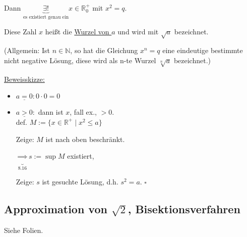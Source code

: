 \documentclass[a4paper, 12pt, twoside] {article}
\begin{document}
Dann $\underbrace{\exists ! }_{\text{es existiert genau ein}} x \in \mathbb{R}_{0}^{+}$ mit $x^2 = q$.

Diese Zahl $x$ heißt die \underline{Wurzel von $a$} und wird mit $\sqrt{a}$ bezeichnet.

(Allgemein: Ist $n \in \mathbb{N}$, so hat die Gleichung $x^n = q$ eine eindeutige bestimmte nicht negative Lösung, diese wird als n-te Wurzel $\sqrt[n]{a}$ bezeichnet.)

\underline{Beweisskizze:}

\begin{itemize}

\item $\underline{a = 0}: 0 \cdot 0 = 0$ \checkmark

\item $\underline{a > 0}:$ dann ist $x$, fall ex., $> 0$. \\
def. $M := \{ x \in \mathbb{R}^{+} \mid x^2 \leq a\}$

Zeige: $M$ ist nach oben beschränkt.

$\underbrace{\Rightarrow}_{8.16} s := \sup M$ existiert,

Zeige: $s$ ist gesuchte Lösung, d.h. $s^2 = a$. \hfill $\square$

\end{itemize}

\subsection{Approximation von $\sqrt{2}$, Bisektionsverfahren} %

Siehe Folien.
\end{document}
